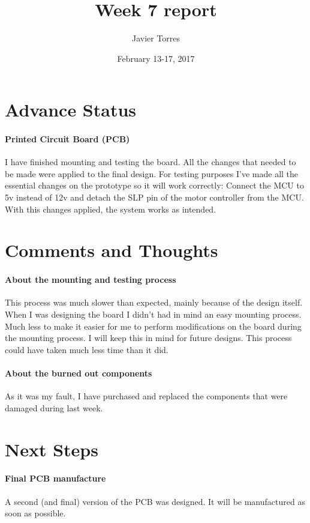 \documentclass{article}
\title{Week 7 report}
\author{Javier Torres}
\date{February 13-17, 2017}
\begin{document}
\maketitle

\tableofcontents

\section{Advance Status}

\paragraph{Printed Circuit Board (PCB)}
I have finished mounting and testing the board. All the changes that needed to be made were applied to the final design.
For testing purposes I've made all the essential changes on the prototype so it will work correctly: Connect the MCU to 5v instead of 12v and detach the SLP pin of the motor controller from the MCU. With this changes applied, the system works as intended.

\section{Comments and Thoughts}

\paragraph{About the mounting and testing process}
This process was much slower than expected, mainly because of the design itself. When I was designing the board I didn't had in mind an easy mounting process. Much less to make it easier for me to perform modifications on the board during the mounting process. I will keep this in mind for future designs. This process could have taken much less time than it did.

\paragraph{About the burned out components}
As it was my fault, I have purchased and replaced the components that were damaged during last week.
\section{Next Steps}

\paragraph{Final PCB manufacture}
A second (and final) version of the PCB was designed. It will be manufactured as soon as possible.
\end{document}
